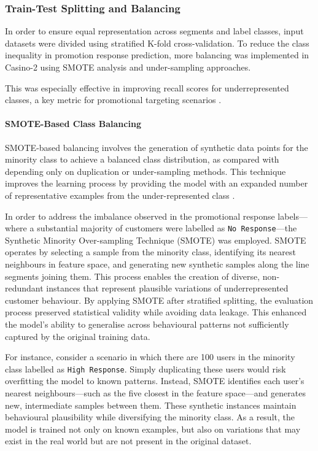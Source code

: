 \documentclass[12pt,a4paper]{report}
\begin{document}
\subsubsection*{Train-Test Splitting and Balancing}

In order to ensure equal representation across segments and label classes, input datasets were divided using stratified K-fold cross-validation.  To reduce the class inequality in promotion response prediction, more balancing was implemented in Casino-2 using SMOTE analysis and under-sampling approaches.

This was especially effective in improving recall scores for underrepresented classes, a key metric for promotional targeting scenarios \citep{bunkhumpornpat2009tomeklinksmote}.


\paragraph{SMOTE-Based Class Balancing}

SMOTE-based balancing involves the generation of synthetic data points for the minority class to achieve a balanced class distribution, as compared with depending only on duplication or under-sampling methods. This technique improves the learning process by providing the model with an expanded number of representative examples from the under-represented class \citep{chawla2002smote}.

In order to address the imbalance observed in the promotional response labels—where a substantial majority of customers were labelled as \texttt{No Response}—the Synthetic Minority Over-sampling Technique (SMOTE) was employed. SMOTE operates by selecting a sample from the minority class, identifying its nearest neighbours in feature space, and generating new synthetic samples along the line segments joining them. This process enables the creation of diverse, non-redundant instances that represent plausible variations of underrepresented customer behaviour. By applying SMOTE after stratified splitting, the evaluation process preserved statistical validity while avoiding data leakage. This enhanced the model's ability to generalise across behavioural patterns not sufficiently captured by the original training data.

For instance, consider a scenario in which there are 100 users in the minority class labelled as \texttt{High Response}. Simply duplicating these users would risk overfitting the model to known patterns. Instead, SMOTE identifies each user’s nearest neighbours—such as the five closest in the feature space—and generates new, intermediate samples between them. These synthetic instances maintain behavioural plausibility while diversifying the minority class. As a result, the model is trained not only on known examples, but also on variations that may exist in the real world but are not present in the original dataset.
\end{document}
